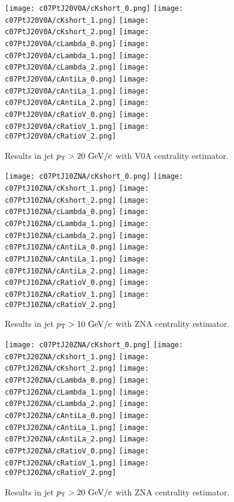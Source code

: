 \begin{figure}[htb]
\begin{center}
\texttt{[image: c07PtJ20V0A/cKshort\_0.png]}
\texttt{[image: c07PtJ20V0A/cKshort\_1.png]}
\texttt{[image: c07PtJ20V0A/cKshort\_2.png]}
\texttt{[image: c07PtJ20V0A/cLambda\_0.png]}
\texttt{[image: c07PtJ20V0A/cLambda\_1.png]}
\texttt{[image: c07PtJ20V0A/cLambda\_2.png]}
\texttt{[image: c07PtJ20V0A/cAntiLa\_0.png]}
\texttt{[image: c07PtJ20V0A/cAntiLa\_1.png]}
\texttt{[image: c07PtJ20V0A/cAntiLa\_2.png]}
\texttt{[image: c07PtJ20V0A/cRatioV\_0.png]}
\texttt{[image: c07PtJ20V0A/cRatioV\_1.png]}
\texttt{[image: c07PtJ20V0A/cRatioV\_2.png]}
\caption{Results in jet $p_{\rm T}>20~{\rm GeV}/c$ with V0A centrality estimator.}
\label{fig:c07PtJ20V0A}
\end{center}
\end{figure}
 
\begin{figure}[htb]
\begin{center}
\texttt{[image: c07PtJ10ZNA/cKshort\_0.png]}
\texttt{[image: c07PtJ10ZNA/cKshort\_1.png]}
\texttt{[image: c07PtJ10ZNA/cKshort\_2.png]}
\texttt{[image: c07PtJ10ZNA/cLambda\_0.png]}
\texttt{[image: c07PtJ10ZNA/cLambda\_1.png]}
\texttt{[image: c07PtJ10ZNA/cLambda\_2.png]}
\texttt{[image: c07PtJ10ZNA/cAntiLa\_0.png]}
\texttt{[image: c07PtJ10ZNA/cAntiLa\_1.png]}
\texttt{[image: c07PtJ10ZNA/cAntiLa\_2.png]}
\texttt{[image: c07PtJ10ZNA/cRatioV\_0.png]}
\texttt{[image: c07PtJ10ZNA/cRatioV\_1.png]}
\texttt{[image: c07PtJ10ZNA/cRatioV\_2.png]}
\caption{Results in jet $p_{\rm T}>10~{\rm GeV}/c$ with ZNA centrality estimator.}
\label{fig:c07PtJ10ZNA}
\end{center}
\end{figure}
 
\begin{figure}[htb]
\begin{center}
\texttt{[image: c07PtJ20ZNA/cKshort\_0.png]}
\texttt{[image: c07PtJ20ZNA/cKshort\_1.png]}
\texttt{[image: c07PtJ20ZNA/cKshort\_2.png]}
\texttt{[image: c07PtJ20ZNA/cLambda\_0.png]}
\texttt{[image: c07PtJ20ZNA/cLambda\_1.png]}
\texttt{[image: c07PtJ20ZNA/cLambda\_2.png]}
\texttt{[image: c07PtJ20ZNA/cAntiLa\_0.png]}
\texttt{[image: c07PtJ20ZNA/cAntiLa\_1.png]}
\texttt{[image: c07PtJ20ZNA/cAntiLa\_2.png]}
\texttt{[image: c07PtJ20ZNA/cRatioV\_0.png]}
\texttt{[image: c07PtJ20ZNA/cRatioV\_1.png]}
\texttt{[image: c07PtJ20ZNA/cRatioV\_2.png]}
\caption{Results in jet $p_{\rm T}>20~{\rm GeV}/c$ with ZNA centrality estimator.}
\label{fig:c07PtJ20ZNA}
\end{center}
\end{figure}
